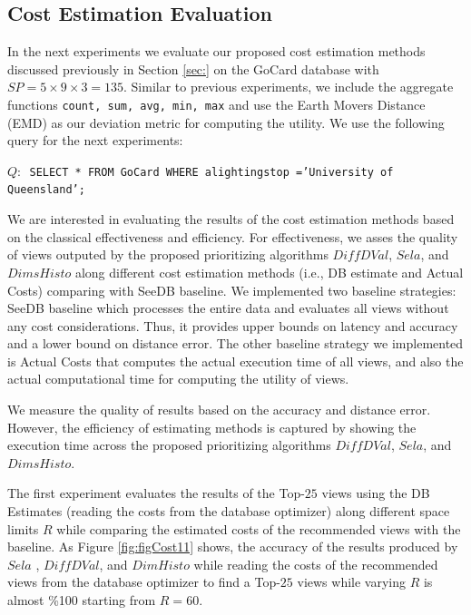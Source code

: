 \subsection{Cost Estimation Evaluation}
\label{sec:results_cost}
%
In the next experiments we evaluate our proposed cost estimation methods discussed previously in Section \ref{sec:} on the GoCard database with $SP = 5 \times 9 \times 3 = 135$.
%
Similar to previous experiments, we include the aggregate functions \texttt{count, sum, avg, min, max} and use the Earth Movers Distance (EMD) as our deviation metric for computing the utility.
%
%
We use the following query for the next experiments:
%
\begin{center}
\texttt{$Q:$ SELECT * FROM GoCard WHERE alightingstop ='University of Queensland'; }
\end{center}
%
%
We are interested in evaluating the results of the cost estimation methods based on the classical effectiveness and efficiency. 
%
For effectiveness, we asses the quality of views outputed by the proposed prioritizing algorithms $Diff DVal$, $Sela$, and $DimsHisto$ along different cost estimation methods (i.e., DB estimate and Actual Costs) comparing with SeeDB baseline.
% 
We implemented two baseline strategies: SeeDB baseline which processes the entire data and evaluates all views without any cost considerations. 
%
Thus, it provides upper bounds on latency and accuracy and a lower bound on distance error. 
%
The other baseline strategy we implemented is Actual Costs that computes the actual execution time of all views, and also the actual computational time for computing the utility of views.
%

We measure the quality of results based on the accuracy and distance error. 
%
However, the efficiency of estimating methods is captured by showing the execution time across the proposed prioritizing algorithms  $Diff DVal$, $Sela$, and $DimsHisto$.
%

The first experiment evaluates the results of the Top-$25$ views using the DB Estimates (reading the costs from the database optimizer) along different space limits $R$ while comparing the estimated costs of the recommended views with the baseline.
%
As Figure \ref{fig:figCost11} shows, the accuracy of the results produced by $Sela$ , $Diff DVal$, and $DimHisto$ while reading the costs of the recommended views from the database optimizer to find a Top-$25$ views while varying $R$ is almost \%100 starting from $R = 60$.

